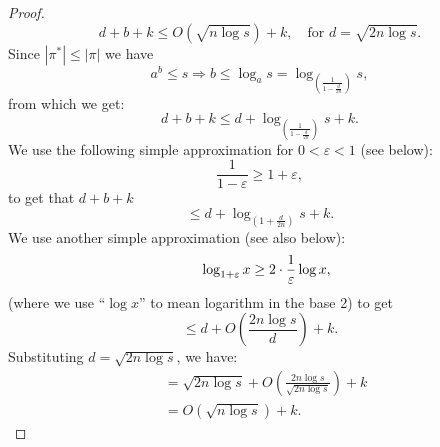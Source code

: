 \begin{proof}
    \[
    d + b + k \leq O\left(\sqrt{n \log s}\right) + k, \quad \text{for } d = \sqrt{2n \log s}.
    \]
Since $|\pi^*|\le|\pi|$ we have
    \[
    a^b \le s \Rightarrow b \le \log_{a} s = 
    \log_{
        \left(
            \frac{1}{1-\frac{d}{2n}}
        \right)
      }s,
    \]
    from which we get:
    \[
    d + b + k \le d + \log_{\left(\frac{1}{1 - \frac{d}{2n}}\right)}s + k.
    \]
    We use the following simple approximation for $0<\varepsilon<1$ (see below):
    \[
    \frac{1}{1 - \varepsilon} \ge  1 + \varepsilon,
    \]
    to get that $d+b+k$
    \[
    \leq d + \log_{\left(1 + \frac{d}{2n} \right)} s + k.
    \]
We use another simple approximation (see also below):
\[
 \quad \log_{1+\varepsilon} x \ge 2\cdot \frac{1}{\varepsilon} \log x,
    \]
(where we use ``$\log x$'' to mean logarithm in the base 2) to get
    \[
    \leq d + O\left(\frac{2n \log s}{d} \right) + k.
    \]
    Substituting $d = \sqrt{2n \log s}$, we have:
    \begin{align*}
    &= \sqrt{2n \log s} + O \left(\frac{2n \log s}{\sqrt{2n \log s}}\right) + k\\
       & = O\left(\sqrt{n \log s} \right) + k.
    \end{align*}
       \mbox{}
\end{proof}

\newcommand{\commentout}[1]{}


